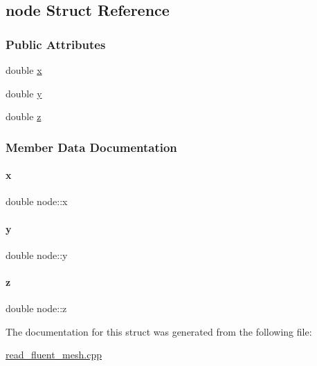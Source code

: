 \hypertarget{structnode}{}\subsection{node Struct Reference}
\label{structnode}
\subsubsection*{Public Attributes}
\begin{DoxyCompactItemize}
\item 
double \hyperlink{structnode_aabf3ca384568672adc30f70f01c9df10}{x}
\item 
double \hyperlink{structnode_ad6b92a3350329877401b880c80ba7d54}{y}
\item 
double \hyperlink{structnode_a53efdff91186dda55481fe141d3f74c6}{z}
\end{DoxyCompactItemize}


\subsubsection{Member Data Documentation}
\mbox{\label{structnode_aabf3ca384568672adc30f70f01c9df10}} 
\paragraph{\texorpdfstring{x}{x}}
{\footnotesize\ttfamily double node\+::x}

\mbox{\label{structnode_ad6b92a3350329877401b880c80ba7d54}} 
\paragraph{\texorpdfstring{y}{y}}
{\footnotesize\ttfamily double node\+::y}

\mbox{\label{structnode_a53efdff91186dda55481fe141d3f74c6}} 
\paragraph{\texorpdfstring{z}{z}}
{\footnotesize\ttfamily double node\+::z}



The documentation for this struct was generated from the following file\+:\begin{DoxyCompactItemize}
\item 
\hyperlink{read__fluent__mesh_8cpp}{read\+\_\+fluent\+\_\+mesh.\+cpp}\end{DoxyCompactItemize}
